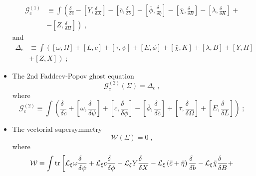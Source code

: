 \documentclass[../main.tex]{subfiles}
\begin{document}
\begin{itemize}
\begin{align}
          \label{eq:1stfpghostop}
          \mathcal{G}^{\left(1\right)}_c & \equiv \int \left(\frac{\delta\phantom{c}}{\delta c}-\left[Y,\frac{\delta\phantom{X}}{\delta X}\right]-\left[\bar{c},\frac{\delta\phantom{b}}{\delta b}\right]-\left[\bar{\phi},\frac{\delta\phantom{\bar{\eta}}}{\delta\bar{\eta}}\right]-\left[\bar{\chi},\frac{\delta\phantom{B}}{\delta B}\right]-\left[\lambda,\frac{\delta\phantom{K}}{\delta K}\right] + \right. \nonumber \\
                                         & \left. - \left[Z,\frac{\delta\phantom{H}}{\delta H}\right]\right) \;,
        \end{align}
        and
        \begin{align}
          \label{eq:linearbreakc}
          \Delta_c & \equiv \int \left(\left[\omega ,\Omega\right]+\left[L,c\right]+\left[\tau,\psi\right]+\left[E,\phi\right]+\left[\bar{\chi},K\right]+\left[\lambda,B\right] + \left[Y,H\right] \right. \nonumber \\
                   & + \left. \left[Z,X\right] \right) \;;
        \end{align}
  \item The 2nd Faddeev-Popov ghost equation
        \begin{equation}
          \label{eq:2ndfpghosteq}
          \mathcal{G}^{\left(2\right)}_c \left(\Sigma\right)=\Delta_c \;,
        \end{equation}
        where
        \begin{equation}
          \label{eq:2ndfpghostop}
          \mathcal{G}^{\left(2\right)}_c \equiv \int \left(\frac{\delta\phantom{c}}{\delta c}+\left[\omega ,\frac{\delta\phantom{\psi}}{\delta \psi}\right]+\left[c,\frac{\delta\phantom{\phi}}{\delta \phi}\right]-\left[\bar{\phi},\frac{\delta\phantom{\bar{c}}}{\delta\bar{c}}\right]+\left[\tau,\frac{\delta\phantom{\Omega}}{\delta \Omega}\right]+\left[E,\frac{\delta\phantom{L}}{\delta L}\right]\right)\;;
        \end{equation}
  \item  The vectorial supersymmetry
        \begin{equation}
          \label{eq:vecsusyeq}
          \mathcal{W}\left(\Sigma\right)=0 \;,
        \end{equation}
        where
        \begin{align}
          \label{eq:vecsusyop}
          \mathcal{W} & \equiv \int \tr \left[\mathcal{L}_\xi \omega \frac{\delta\phantom{\psi}}{\delta\psi}+\mathcal{L}_\xi c\frac{\delta\phantom{\phi}}{\delta\phi} - \mathcal{L}_\xi Y \frac{\delta\phantom{X}}{\delta X}-\mathcal{L}_\xi\left(\bar{c}+\bar{\eta}\right)\frac{\delta\phantom{b}}{\delta b} - \mathcal{L}_\xi \bar{\chi}\frac{\delta\phantom{B}}{\delta B}+ \right. \nonumber \\

\end{align}
\end{itemize}
\end{document}
